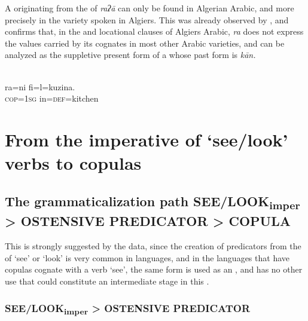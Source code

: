 \documentclass[output=paper]{langsci/langscibook}
\begin{document}
A  originating from the  of \textit{raʔā} can only be found in Algerian Arabic, and more precisely in the variety spoken in Algiers. This was already observed by \citet[252]{Cohen1912}, and \citet{Boucherit2002} confirms that, in the  and locational clauses of Algiers Arabic, \textit{ra} does not express the values carried by its cognates in most other Arabic varieties, and can be analyzed as the suppletive present form of a  whose past form is \textit{kān.}

\ea%
    \label{ex:creissels:11}
\\
 \gll    ra=ni  fi=l=kuzina.\\
   \textsc{cop}=\textsc{1sg}  in=\textsc{def}=kitchen\\
\z


\section{From the imperative of ‘see\slash look’ verbs to copulas}\label{sec:creissels:6}

\subsection{The grammaticalization path SEE\slash LOOK\textsubscript{imper} > OSTENSIVE PREDICATOR > COPULA}\label{sec:creissels:6.1} 

This  is strongly suggested by the  data, since the creation of  predicators from the  of ‘see’ or ‘look’ is very common in  languages, and in the  languages that have copulas cognate with a verb ‘see’, the same form is used as an  , and has no other use that could constitute an intermediate stage in this . 

\subsubsection{SEE\slash LOOK\textsubscript{imper} > OSTENSIVE PREDICATOR}\label{sec:creissels:6.1.1} 
\end{document}
